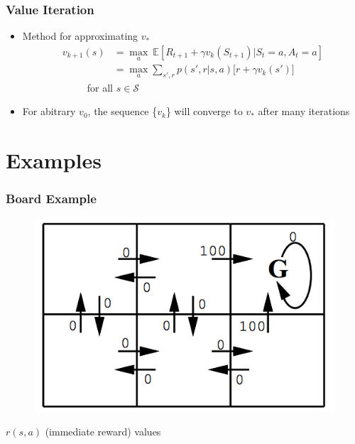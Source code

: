 \documentclass{beamer}
\begin{document}

\begin{frame}
\frametitle{Value Iteration}
\begin{itemize}
\item Method for approximating $v_{\ast}$
\begin{align*}
v_{k+1}(s) &= \underset{a}{\max} \ \mathbb{E}[R_{t+1} + \gamma v_{k}(S_{t+1}) | S_t = a, A_t = a] \\
&= \underset{a}{\max} \sum_{s',r} p(s',r|s,a) \big[ r + \gamma v_k(s') \big]
\nonumber
\end{align*}
\ \ \ \ \ \ \ \ \ \ \ \ \ for all $s \in \mathscr{S}$
\item For abitrary $v_0$, the sequence \{$v_k$\} will converge to $v_*$ after many iterations
\end{itemize}
\end{frame}

\section{Examples} %



\begin{frame}
\frametitle{Board Example}
\begin{figure}[t]
\includegraphics[scale=0.3]{Board1}
\centering
\end{figure}
$r(s,a)$ (immediate reward) values
\centering
\end{frame}
\end{document}
